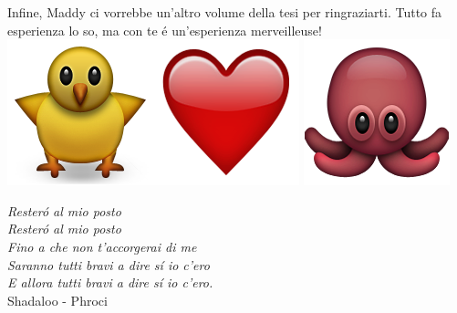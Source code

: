 \noindent Infine, Maddy ci vorrebbe un'altro volume della tesi per ringraziarti. Tutto fa esperienza lo so, ma con te \'e un'esperienza merveilleuse!  \includegraphics[height=1.5\fontcharht\font`A]{figures/ack/EmojiNature/EmojiNatur-24.png}\includegraphics[height=1.5\fontcharht\font`A]{figures/ack/EmojiSmiley/EmojiSmiley-173.png} \includegraphics[height=1.5\fontcharht\font`A]{figures/ack/EmojiNature/EmojiNatur-34.png}\\


\vspace{0.5cm}

\begin{flushright}
\emph{Rester\'o al mio posto\\
Rester\'o al mio posto\\
Fino a che non t'accorgerai di me\\
Saranno tutti bravi a dire s\'i io c'ero\\
E allora tutti bravi a dire s\'i io c'ero.\\} 
Shadaloo - Phroci
\end{flushright}








